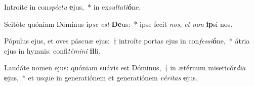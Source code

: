 \item Introíte in con\textit{spéc}\textit{tu} \textbf{e}jus,~* in ex\textit{sul}\textit{ta}\textit{ti}\textbf{ó}ne.
\item Scitóte quóniam Dóminus ip\textit{se} \textit{est} \textbf{De}us:~* ipse fecit \textit{nos}, \textit{et} \textit{non} \textbf{ip}si nos.
\item Pópulus ejus, et oves páscuæ ejus:~† introíte portas ejus in con\textit{fes}\textit{si}\textbf{ó}ne,~* átria ejus in hymnis: confi\textit{té}\textit{mi}\textit{ni} \textbf{il}li.
\item Laudáte nomen ejus: quóniam suávis est Dóminus,~† in ætérnum misericór\textit{di}\textit{a} \textbf{e}jus,~* et usque in generatiónem et generatiónem \textit{vé}\textit{ri}\textit{tas} \textbf{e}jus.
